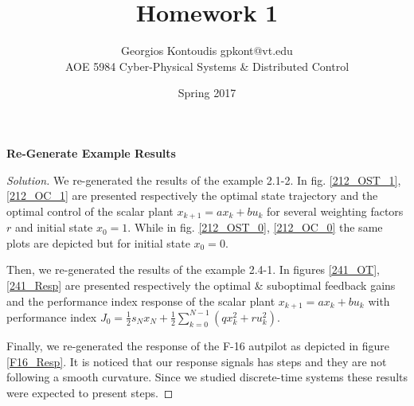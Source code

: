 \documentclass[12pt]{article}
\newenvironment{question}[2][Question]{\begin{trivlist}
\item[\hskip \labelsep {\bfseries #1}\hskip \labelsep {\bfseries #2.}]}{\end{trivlist}}
\newenvironment{solution}{\begin{proof}[Solution]}{\end{proof}}
\begin{document}
 
 
\title{Homework 1}
\author{Georgios Kontoudis \textbullet{} gpkont@vt.edu\\ 
AOE 5984 Cyber-Physical Systems \& Distributed Control} 
\date{Spring 2017}
 
\maketitle
\begin{question}{1} %
\textbf{Re-Generate Example Results}
\end{question}
\begin{solution}
We re-generated the results of the example 2.1-2. In fig. \ref{212_OST_1}, \ref{212_OC_1} are presented respectively the optimal state trajectory and the optimal control of the scalar plant $x_{k+1} = ax_k+bu_k$ for several weighting factors $r$ and initial state $x_0=1$. While in fig. \ref{212_OST_0}, \ref{212_OC_0} the same plots are depicted but for initial state $x_0=0$.

Then, we re-generated the results of the example 2.4-1. In figures \ref{241_OT}, \ref{241_Resp} are presented respectively the optimal \& suboptimal feedback gains and the performance index response of the scalar plant $x_{k+1} = ax_k+bu_k$ with performance index $J_0 = \frac{1}{2}s_Nx_N + \frac{1}{2} \sum_{k=0}^{N-1}(qx_k^2+ru_k^2)$. 

Finally, we re-generated the response of the F-16 autpilot as depicted in figure \ref{F16_Resp}. It is noticed that our response signals has steps and they are not following a smooth curvature. Since we studied discrete-time systems these results were expected to present steps.  

\end{solution}
\end{document}
